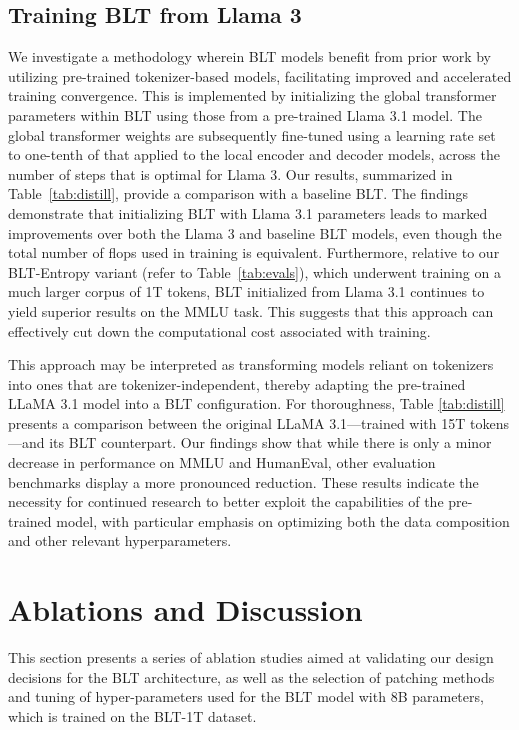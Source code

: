 \subsection{Training {\textsc BLT} from Llama 3}
\label{sec:distillation}
We investigate a methodology wherein {\textsc BLT} models benefit from prior work by utilizing pre-trained tokenizer-based models, facilitating improved and accelerated training convergence. This is implemented by initializing the global transformer parameters within {\textsc BLT} using those from a pre-trained Llama 3.1 model. The global transformer weights are subsequently fine-tuned using a learning rate set to one-tenth of that applied to the local encoder and decoder models, across the number of steps that is optimal for Llama 3. Our results, summarized in Table~\ref{tab:distill}, provide a comparison with a baseline {\textsc BLT}. The findings demonstrate that initializing {\textsc BLT} with Llama 3.1 parameters leads to marked improvements over both the Llama 3 and baseline {\textsc BLT} models, even though the total number of flops used in training is equivalent. Furthermore, relative to our {\textsc BLT}-Entropy variant (refer to Table~\ref{tab:evals}), which underwent training on a much larger corpus of 1T tokens, {\textsc BLT} initialized from Llama 3.1 continues to yield superior results on the MMLU task. This suggests that this approach can effectively cut down the computational cost associated with training.

This approach may be interpreted as transforming models reliant on tokenizers into ones that are tokenizer-independent, thereby adapting the pre-trained LLaMA 3.1 model into a {\textsc BLT} configuration. For thoroughness, Table \ref{tab:distill} presents a comparison between the original LLaMA 3.1—trained with 15T tokens—and its {\textsc BLT} counterpart. Our findings show that while there is only a minor decrease in performance on MMLU and HumanEval, other evaluation benchmarks display a more pronounced reduction. These results indicate the necessity for continued research to better exploit the capabilities of the pre-trained model, with particular emphasis on optimizing both the data composition and other relevant hyperparameters.

\section{Ablations and Discussion}
\label{section:ablations}
This section presents a series of ablation studies aimed at validating our design decisions for the {\textsc BLT} architecture, as well as the selection of patching methods and tuning of hyper-parameters used for the {\textsc BLT} model with 8B parameters, which is trained on the {\textsc BLT}-1T dataset.

